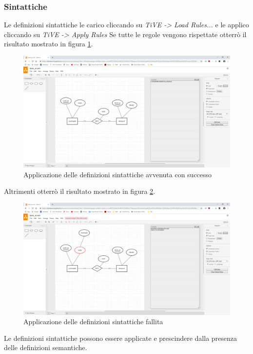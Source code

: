             \subsubsection{Sintattiche}
                Le definizioni sintattiche le carico cliccando su \textit{TiVE -> Load Rules...} e le applico cliccando su \textit{TiVE -> Apply Rules}
                \newline
                Se tutte le regole vengono rispettate otterrò il risultato mostrato in figura \ref{fig:syntaxOK}.
                \begin{figure}[htbp]
                    \centering
                    \includegraphics[scale=0.2]{Figure/drawse/syntax_rule_OK.PNG}
                    \caption{Applicazione delle definizioni sintattiche avvenuta con successo}
                    \label{fig:syntaxOK}
                \end{figure}
                \newline
                Altrimenti otterrò il risultato mostrato in figura \ref{fig:syntaxNO}.
                \begin{figure}[htbp]
                    \centering
                    \includegraphics[scale=0.2]{Figure/drawse/syntax_rule_FAIL.PNG}
                    \caption{Applicazione delle definizioni sintattiche fallita}
                    \label{fig:syntaxNO}
                \end{figure}
                \newline
                Le definizioni sintattiche possono essere applicate e prescindere dalla presenza delle definizioni semantiche.

